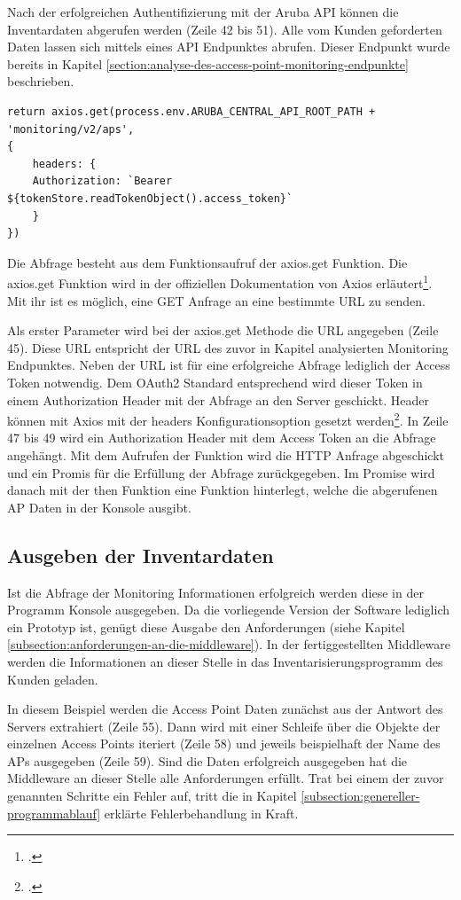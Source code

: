 Nach der erfolgreichen Authentifizierung mit der Aruba API können die Inventardaten abgerufen werden (Zeile 42 bis 51). Alle vom Kunden geforderten Daten lassen sich mittels eines API Endpunktes abrufen. Dieser Endpunkt wurde bereits in Kapitel \ref{section:analyse-des-access-point-monitoring-endpunkte} beschrieben. 

\lstset{
    firstnumber=45,
    breaklines=true
}
\begin{lstlisting}
return axios.get(process.env.ARUBA_CENTRAL_API_ROOT_PATH + 'monitoring/v2/aps',
{
    headers: {
    Authorization: `Bearer ${tokenStore.readTokenObject().access_token}`
    }
})    
\end{lstlisting}

Die Abfrage besteht aus dem Funktionsaufruf der axios.get Funktion. Die axios.get Funktion wird in der offiziellen Dokumentation von Axios erläutert\footcite{zabriskie_axios_2021-1}. Mit ihr ist es möglich, eine GET Anfrage an eine bestimmte URL zu senden. 

Als erster Parameter wird bei der axios.get Methode die URL angegeben (Zeile 45). Diese URL entspricht der URL des zuvor in Kapitel analysierten Monitoring Endpunktes. Neben der URL ist für eine erfolgreiche Abfrage lediglich der Access Token notwendig. Dem OAuth2 Standard entsprechend wird dieser Token in einem Authorization Header mit der Abfrage an den Server geschickt. Header können mit Axios mit der headers Konfigurationsoption gesetzt werden\footcite{zabriskie_axios_2021}. In Zeile 47 bis 49 wird ein Authorization Header mit dem Access Token an die Abfrage angehängt. Mit dem Aufrufen der Funktion wird die HTTP Anfrage abgeschickt und ein Promis für die Erfüllung der Abfrage zurückgegeben. Im Promise wird danach mit der then Funktion eine Funktion hinterlegt, welche die abgerufenen AP Daten in der Konsole ausgibt.

\subsection{Ausgeben der Inventardaten}\label{subsection:ausgeben-der-Inventardaten}

Ist die Abfrage der Monitoring Informationen erfolgreich werden diese in der Programm Konsole ausgegeben. Da die vorliegende Version der Software lediglich ein Prototyp ist, genügt diese Ausgabe den Anforderungen (siehe Kapitel \ref{subsection:anforderungen-an-die-middleware}). In der fertiggestellten Middleware werden die Informationen an dieser Stelle in das Inventarisierungsprogramm des Kunden geladen. 

In diesem Beispiel werden die Access Point Daten zunächst aus der Antwort des Servers extrahiert (Zeile 55). Dann wird mit einer Schleife über die Objekte der einzelnen Access Points iteriert (Zeile 58) und jeweils beispielhaft der Name des APs ausgegeben (Zeile 59).
Sind die Daten erfolgreich ausgegeben hat die Middleware an dieser Stelle alle Anforderungen erfüllt. Trat bei einem der zuvor genannten Schritte ein Fehler auf, tritt die in Kapitel \ref{subsection:genereller-programmablauf} erklärte Fehlerbehandlung in Kraft.




